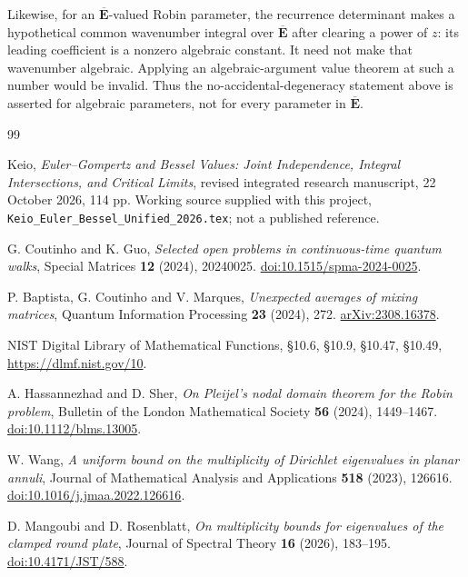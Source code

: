 \documentclass[11pt]{article}
\theoremstyle{definition}
\theoremstyle{remark}
\begin{document}
Likewise, for an $\overline{\mathbf E}$-valued Robin parameter, the
recurrence determinant makes a hypothetical common wavenumber integral
over $\overline{\mathbf E}$ after clearing a power of $z$: its leading
coefficient is a nonzero algebraic constant.  It need not make that
wavenumber algebraic.  Applying an algebraic-argument value theorem
at such a number would be invalid.  Thus the no-accidental-degeneracy
statement above is asserted for algebraic parameters, not for every
parameter in $\overline{\mathbf E}$.


\begin{thebibliography}{99}

Keio, \emph{Euler--Gompertz and Bessel Values: Joint Independence,
Integral Intersections, and Critical Limits}, revised integrated research
manuscript, 22 October 2026, 114 pp. Working source supplied with this project,
\texttt{Keio\_Euler\_Bessel\_Unified\_2026.tex}; not a published reference.

G. Coutinho and K. Guo, \emph{Selected open problems in continuous-time
quantum walks}, Special Matrices \textbf{12} (2024), 20240025.
\href{https://doi.org/10.1515/spma-2024-0025}{doi:10.1515/spma-2024-0025}.

P. Baptista, G. Coutinho and V. Marques,
\emph{Unexpected averages of mixing matrices}, Quantum Information
Processing \textbf{23} (2024), 272.
\href{https://arxiv.org/abs/2308.16378}{arXiv:2308.16378}.

NIST Digital Library of Mathematical Functions, \S10.6, \S10.9,
\S10.47, \S10.49, \url{https://dlmf.nist.gov/10}.

A. Hassannezhad and D. Sher, \emph{On Pleijel's nodal domain theorem
for the Robin problem}, Bulletin of the London Mathematical Society
\textbf{56} (2024), 1449--1467.
\href{https://doi.org/10.1112/blms.13005}{doi:10.1112/blms.13005}.

W. Wang, \emph{A uniform bound on the multiplicity of Dirichlet
eigenvalues in planar annuli}, Journal of Mathematical Analysis and
Applications \textbf{518} (2023), 126616.
\href{https://doi.org/10.1016/j.jmaa.2022.126616}{doi:10.1016/j.jmaa.2022.126616}.

D. Mangoubi and D. Rosenblatt, \emph{On multiplicity bounds for eigenvalues
of the clamped round plate}, Journal of Spectral Theory \textbf{16}
(2026), 183--195.
\href{https://doi.org/10.4171/JST/588}{doi:10.4171/JST/588}.


\end{thebibliography}
\end{document}
